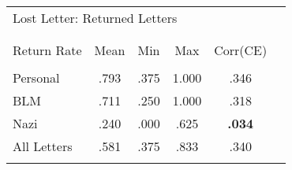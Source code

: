 \documentclass{standalone}
\begin{document}

\color[HTML]{342C5C}


\centering

\color[HTML]{342C5C}

\begin{tabular}{lccccc}
\multicolumn{5}{l}{Lost Letter: Returned Letters}\\[-1.0ex] 
\\[-1.8ex]\hline 
\hline \\[-1.8ex] 
Return Rate       & Mean    & Min    & Max    & Corr(CE) \\
\hline \\[-1.8ex] 
Personal	        & .793   & .375  & 1.000  & .346  \\
BLM	              & .711   &	.250  & 1.000  & .318  \\
Nazi              &	.240   &	.000  & .625  & \textcolor{colred}{\textbf{.034}}  \\
All Letters       & .581   & .375  & .833  & .340  \\
\hline \\[-1.8ex]
\end{tabular}
\end{document}
